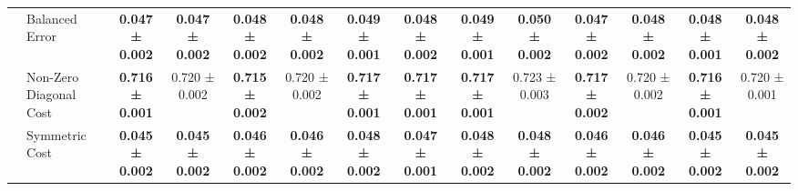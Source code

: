 \begin{table}[H]
{\begin{tabular}{llcccccccccccc}
 & Balanced Error & \textbf{0.047 ± 0.002} & \textbf{0.047 ± 0.002} & \textbf{0.048 ± 0.002} & \textbf{0.048 ± 0.002} & \textbf{0.049 ± 0.001} & \textbf{0.048 ± 0.002} & \textbf{0.049 ± 0.001} & \textbf{0.050 ± 0.002} & \textbf{0.047 ± 0.002} & \textbf{0.048 ± 0.002} & \textbf{0.048 ± 0.001} & \textbf{0.048 ± 0.002} \\
 & Non-Zero Diagonal Cost & \textbf{0.716 ± 0.001} & 0.720 ± 0.002 & \textbf{0.715 ± 0.002} & 0.720 ± 0.002 & \textbf{0.717 ± 0.001} & \textbf{0.717 ± 0.001} & \textbf{0.717 ± 0.001} & 0.723 ± 0.003 & \textbf{0.717 ± 0.002} & 0.720 ± 0.002 & \textbf{0.716 ± 0.001} & 0.720 ± 0.001 \\
 & Symmetric Cost & \textbf{0.045 ± 0.002} & \textbf{0.045 ± 0.002} & \textbf{0.046 ± 0.002} & \textbf{0.046 ± 0.002} & \textbf{0.048 ± 0.002} & \textbf{0.047 ± 0.001} & \textbf{0.048 ± 0.002} & \textbf{0.048 ± 0.002} & \textbf{0.046 ± 0.002} & \textbf{0.046 ± 0.002} & \textbf{0.045 ± 0.002} & \textbf{0.045 ± 0.002} \\
\cline{1-14}
\bottomrule
\end{tabular}
    }
\end{table}
